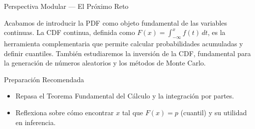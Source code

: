 \documentclass[10pt, aspectratio=169]{beamer}
\begin{document}
\begin{frame}{Perspectiva Modular --- El Próximo Reto}
  \scriptsize
  \begin{retoclase}
    Acabamos de introducir la PDF como objeto fundamental de las variables continuas. La CDF continua, definida como $F(x) = \int_{-\infty}^{x} f(t)\,dt$, es la herramienta complementaria que permite calcular probabilidades acumuladas y definir cuantiles. También estudiaremos la inversión de la CDF, fundamental para la generación de números aleatorios y los métodos de Monte Carlo.
  \end{retoclase}

  \vspace{0.08cm}
  \pause
  \begin{alertblock}{Preparación Recomendada}
    \begin{itemize}\itemsep=0.06cm
      \item Repasa el Teorema Fundamental del Cálculo y la integración por partes.
      \item Reflexiona sobre cómo encontrar $x$ tal que $F(x) = p$ (cuantil) y su utilidad en inferencia.
    \end{itemize}
  \end{alertblock}
\end{frame}
\end{document}
